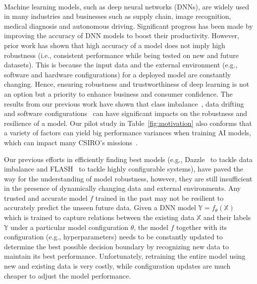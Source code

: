 \thispagestyle{empty}
 \begin{center}
{\bf \TITLE}\\
{
}
 \end{center}
\vspace{-3mm}
\noindent

Machine learning models, such as deep neural networks (DNNs), are widely used in many industries and businesses such as supply chain, image  recognition, medical diagnosis and autonomous driving. Significant progress has been made by improving the accuracy of DNN models to boost their productivity. 
However, prior work has shown that high accuracy of a model does not imply high robustness (i.e., consistent performance while being tested on new and future datasets). This is because the input data and the external environment (e.g., software and hardware configurations) for a deployed model are constantly changing. 
Hence, ensuring robustness and trustworthiness of deep learning is not an option but a priority to enhance business and consumer confidence.
The results from our previous work have shown that class imbalance~\cite{shumsr22}, data drifting~\cite{majumder2022methods} and software configurations~\cite{xiao2021nondeterministic} can have significant impacts on the robustness and resilience of a model. Our pilot study in Table~\ref{fig:motivation} also conforms that a variety of factors can yield big performance variances when training AI models, which can  impact many CSIRO's missions~\cite{csiromission}.

Our previous efforts in efficiently finding best models (e.g., Dazzle~\cite{shumsr22} to tackle data imbalance and FLASH~\cite{nair2018finding} to tackle highly configurable systems), have paved the way for the understanding of model robustness, however, they are still insufficient in the presence of dynamically changing data and external environments.
Any trusted and accurate model $f$ trained in the past may not be resilient to accurately predict the unseen future data. 
Given a DNN model $\mathbb{Y} = f_\theta(\mathbb{X})$ which is trained to capture relations between the existing data $\mathbb{X}$ and their labels $\mathbb{Y}$ under a particular model configuration $\theta$, the model $f$ together with its configuration (e.g., hyperparameters) needs to be constantly updated to determine the best possible decision boundary by recognizing new data to maintain its best performance.
Unfortunately, retraining the entire model using new and existing data is very costly, while configuration updates are much cheaper to adjust the model performance.

